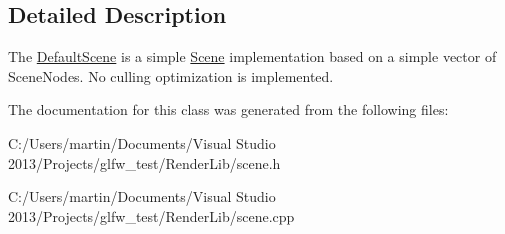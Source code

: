 \subsection{Detailed Description}
The \hyperlink{class_default_scene}{Default\+Scene} is a simple \hyperlink{class_scene}{Scene} implementation based on a simple vector of Scene\+Nodes. No culling optimization is implemented. 

The documentation for this class was generated from the following files\+:\begin{DoxyCompactItemize}
\item 
C\+:/\+Users/martin/\+Documents/\+Visual Studio 2013/\+Projects/glfw\+\_\+test/\+Render\+Lib/scene.\+h\item 
C\+:/\+Users/martin/\+Documents/\+Visual Studio 2013/\+Projects/glfw\+\_\+test/\+Render\+Lib/scene.\+cpp\end{DoxyCompactItemize}
